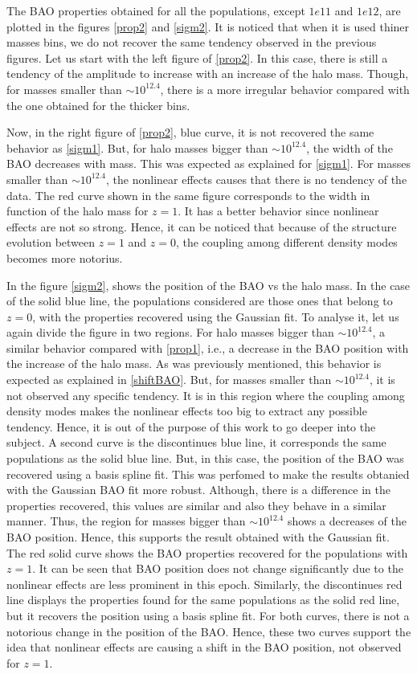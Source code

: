 The BAO properties obtained for all the populations, except $1e11$ and $1e12$,
are plotted in the figures \ref{prop2} and \ref{sigm2}. It is noticed that when it is used
thiner masses bins, we do not recover the same tendency observed in the previous
figures. Let us start with the left figure of \ref{prop2}. In this case, there is
still a tendency of the amplitude to increase with an increase of the halo mass.
Though, for masses smaller than $\sim 10^{12.4}$, there is a more irregular behavior
compared with the one obtained for the thicker bins. 

Now, in the right figure of \ref{prop2}, blue curve, it is not recovered the same behavior as \ref{sigm1}.
But, for halo masses bigger than $\sim 10^{12.4}$, the width of the BAO decreases
with mass. This was expected as explained for \ref{sigm1}. For masses smaller than
$\sim 10^{12.4}$, the nonlinear effects causes that there is no tendency of the 
data. The red curve shown in the same figure corresponds to the width in function of the 
halo mass for $z=1$. It has a better behavior since nonlinear effects are not so strong.
Hence, it can be noticed that because of the structure evolution between $z=1$ and $z=0$, 
the coupling among different density modes becomes more notorius. 

In the figure \ref{sigm2}, shows the position of the BAO vs the halo mass.
In the case of the solid blue line, the populations considered are those ones that
belong to $z=0$, with the properties recovered using the Gaussian fit. To analyse it, 
let us again divide the figure in two regions. For halo masses bigger than $\sim 10^{12.4}$,
a similar behavior compared with \ref{prop1}, i.e., a decrease in the BAO position with
the increase of the halo mass. As was previously mentioned, this behavior is expected 
as explained in \ref{shiftBAO}. But, for masses smaller than $\sim 10^{12.4}$, it is not 
observed any specific tendency. It is in this region where the coupling among density
modes makes the nonlinear effects too big to extract any possible tendency. Hence, it 
is out of the purpose of this work to go deeper into the subject. 
A second curve is the discontinues blue line, it corresponds the same populations 
as the solid blue line. But, in this case, the position of the BAO was recovered
using a basis spline fit. This was perfomed to make the results obtanied
with the Gaussian BAO fit more robust. Although, there is a difference in the properties
recovered, this values are similar and also they behave in a similar manner. Thus,
the region for masses bigger than $\sim 10^{12.4}$ shows a decreases of the BAO position.
Hence, this supports the result obtained with the Gaussian fit. 
The red solid curve shows the BAO properties recovered for the populations with $z=1$.
It can be seen that BAO position does not change significantly due to the nonlinear 
effects are less prominent in this epoch. Similarly, the discontinues red line displays
the properties found for the same populations as the solid red line, but it recovers
the position using a basis spline fit. For both curves, there is not a notorious change 
in the position of the BAO. Hence, these two curves support the idea that nonlinear 
effects are causing a shift in the BAO position, not observed for $z=1$. 


